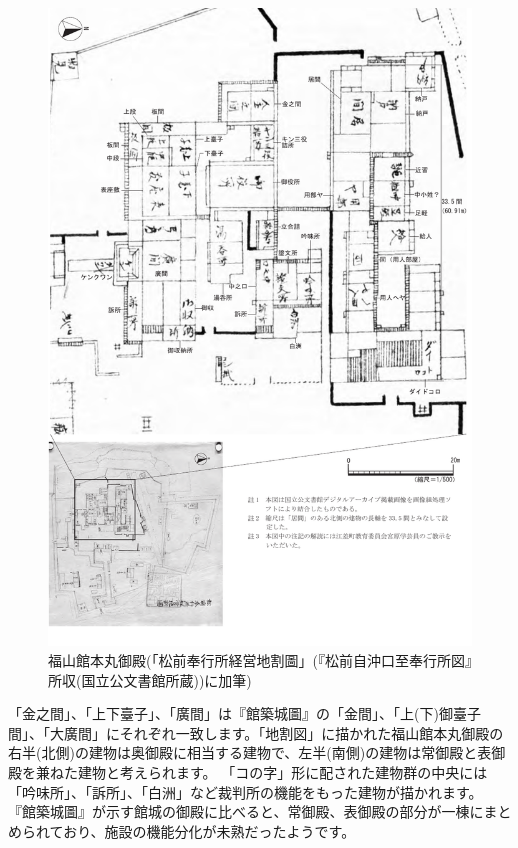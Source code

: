 \documentclass[11pt,report]{jsbook}
\begin{document}
\begin{figure}[h]
\centering
\includegraphics[width=160truemm]{fig/13.pdf}
\caption{福山館本丸御殿(「松前奉行所経営地割圖」(『松前自沖口至奉行所図』所収(国立公文書館所蔵))に加筆)}
\label{fig13}
\end{figure}

「金之間」、「上下臺子」、「廣間」は『館築城圖』の「金間」、「上(下)御臺子間」、「大廣間」にそれぞれ一致します。「地割図」に描かれた福山館本丸御殿の右半(北側)の建物は奥御殿に相当する建物で、左半(南側)の建物は常御殿と表御殿を兼ねた建物と考えられます。
「コの字」形に配された建物群の中央には「吟味所」、「訴所」、「白洲」など裁判所の機能をもった建物が描かれます。
『館築城圖』が示す館城の御殿に比べると、常御殿、表御殿の部分が一棟にまとめられており、施設の機能分化が未熟だったようです。
\end{document}
